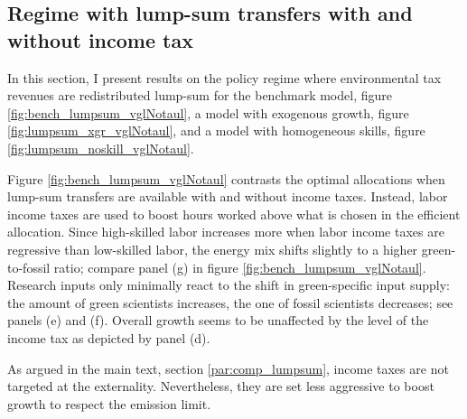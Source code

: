 \begin{figure}[h!!]
\begin{minipage}[]{0.32\textwidth}
	\end{minipage}
\end{figure}


\subsection{Regime with lump-sum transfers with and without income tax}\label{app:lumps}
In this section, I present results on the policy regime where environmental tax revenues are redistributed lump-sum for the benchmark model, figure \ref{fig:bench_lumpsum_vglNotaul}, a model with exogenous growth, figure \ref{fig:lumpsum_xgr_vglNotaul}, and a model with homogeneous skills, figure \ref{fig:lumpsum_noskill_vglNotaul}. 

 Figure \ref{fig:bench_lumpsum_vglNotaul} contrasts the optimal allocations when lump-sum transfers are available with and without income taxes. Instead, labor income taxes are used to boost hours worked above what is chosen in the efficient allocation. Since high-skilled labor increases more when labor income taxes are regressive than low-skilled labor, the energy mix shifts slightly to a higher green-to-fossil ratio; compare panel (g) in figure \ref{fig:bench_lumpsum_vglNotaul}. Research inputs only minimally react to the shift in green-specific input supply: the amount of green scientists increases, the one of fossil scientists decreases; see panels (e) and (f). Overall growth seems to be unaffected by the level of the income tax as depicted by panel (d). 

As argued in the main text, section \ref{par:comp_lumpsum}, income taxes are not targeted at the externality. Nevertheless, they are set less aggressive to boost growth to respect the emission limit. 

